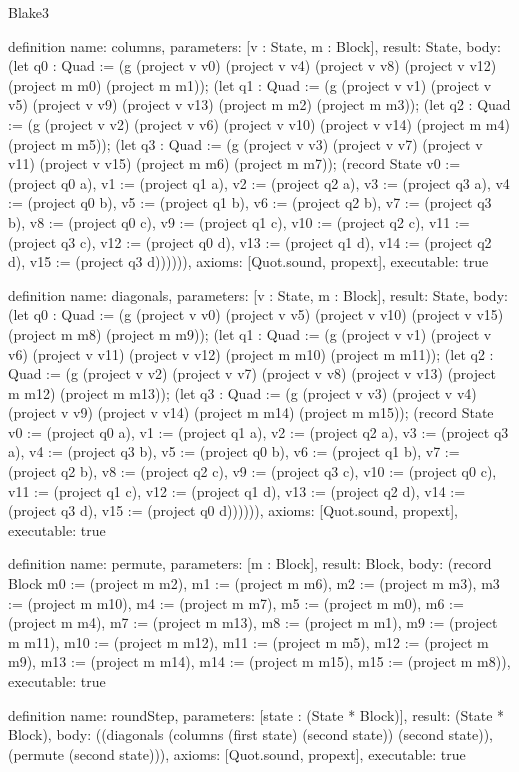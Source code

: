 \begin{lexlean}{Blake3}
\begin{semanticmodule}
definition{
  name: columns,
  parameters: [v : State, m : Block],
  result: State,
  body: (let q0 : Quad := (g (project v v0) (project v v4) (project v v8) (project v v12) (project m m0) (project m m1)); (let q1 : Quad := (g (project v v1) (project v v5) (project v v9) (project v v13) (project m m2) (project m m3)); (let q2 : Quad := (g (project v v2) (project v v6) (project v v10) (project v v14) (project m m4) (project m m5)); (let q3 : Quad := (g (project v v3) (project v v7) (project v v11) (project v v15) (project m m6) (project m m7)); (record State {v0 := (project q0 a), v1 := (project q1 a), v2 := (project q2 a), v3 := (project q3 a), v4 := (project q0 b), v5 := (project q1 b), v6 := (project q2 b), v7 := (project q3 b), v8 := (project q0 c), v9 := (project q1 c), v10 := (project q2 c), v11 := (project q3 c), v12 := (project q0 d), v13 := (project q1 d), v14 := (project q2 d), v15 := (project q3 d)}))))),
  axioms: [Quot.sound, propext],
  executable: true
}

definition{
  name: diagonals,
  parameters: [v : State, m : Block],
  result: State,
  body: (let q0 : Quad := (g (project v v0) (project v v5) (project v v10) (project v v15) (project m m8) (project m m9)); (let q1 : Quad := (g (project v v1) (project v v6) (project v v11) (project v v12) (project m m10) (project m m11)); (let q2 : Quad := (g (project v v2) (project v v7) (project v v8) (project v v13) (project m m12) (project m m13)); (let q3 : Quad := (g (project v v3) (project v v4) (project v v9) (project v v14) (project m m14) (project m m15)); (record State {v0 := (project q0 a), v1 := (project q1 a), v2 := (project q2 a), v3 := (project q3 a), v4 := (project q3 b), v5 := (project q0 b), v6 := (project q1 b), v7 := (project q2 b), v8 := (project q2 c), v9 := (project q3 c), v10 := (project q0 c), v11 := (project q1 c), v12 := (project q1 d), v13 := (project q2 d), v14 := (project q3 d), v15 := (project q0 d)}))))),
  axioms: [Quot.sound, propext],
  executable: true
}

definition{
  name: permute,
  parameters: [m : Block],
  result: Block,
  body: (record Block {m0 := (project m m2), m1 := (project m m6), m2 := (project m m3), m3 := (project m m10), m4 := (project m m7), m5 := (project m m0), m6 := (project m m4), m7 := (project m m13), m8 := (project m m1), m9 := (project m m11), m10 := (project m m12), m11 := (project m m5), m12 := (project m m9), m13 := (project m m14), m14 := (project m m15), m15 := (project m m8)}),
  executable: true
}

definition{
  name: roundStep,
  parameters: [state : (State * Block)],
  result: (State * Block),
  body: ((diagonals (columns (first state) (second state)) (second state)), (permute (second state))),
  axioms: [Quot.sound, propext],
  executable: true
}


\end{semanticmodule}
\end{lexlean}
